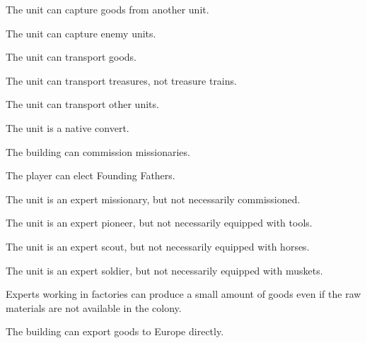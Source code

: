 \documentclass[12pt]{book}
\begin{document}
\affectsUnit

The unit can capture goods from another unit.

\affectsUnit

The unit can capture enemy units.

\affectsUnit

The unit can transport goods.

\affectsUnit

The unit can transport treasures, not treasure trains.

\affectsUnit

The unit can transport other units.

\affectsUnit

The unit is a native convert.

\affectsBuilding

The building can commission missionaries.

\affectsPlayer

The player can elect Founding Fathers.

\affectsUnit

The unit is an expert missionary, but not necessarily commissioned.

\affectsUnit

The unit is an expert pioneer, but not necessarily equipped with tools.

\affectsUnit

The unit is an expert scout, but not necessarily equipped with horses.

\affectsUnit

The unit is an expert soldier, but not necessarily equipped with muskets.

\affectsPlayer

Experts working in factories can produce a small amount of goods even
if the raw materials are not available in the colony.

\affectsBuilding

The building can export goods to Europe directly.
\end{document}

